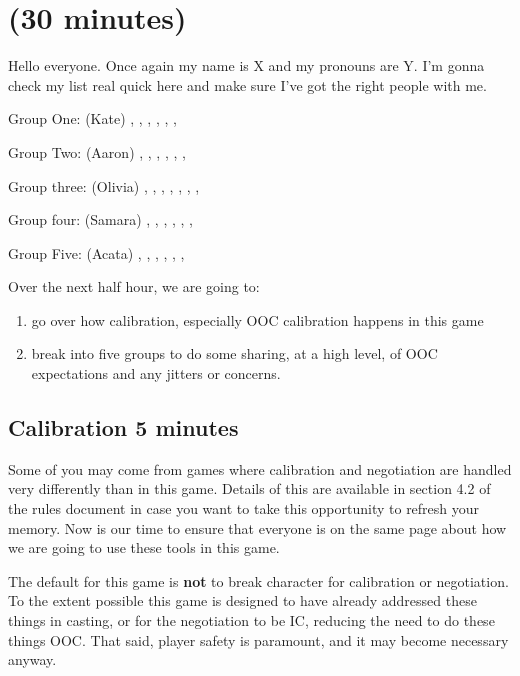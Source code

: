 \documentclass[green]{GL2020}
\begin{document}
\name{\gCalibrationWS{}}

\section*{(30 minutes)}


Hello everyone.  Once again my name is X and my pronouns are Y. I'm gonna check my list real quick here and make sure I've got the right people with me.

Group One: (Kate)
\cPrince{}, \cPirate{}, \cFlowPriest{}, \cCurse{}, \cChupLeader{}, \cAdopted{}, \cMusic{}

Group Two: (Aaron)
\cLibAssist{}, \cEvil{}, \cHistory{}, \cChupSecond{}, \cAntiChup{}, \cScholarship{}, \cChupInventor{}

Group three: (Olivia)
\cBeetle{}, \cEthics{}, \cJuniorStatesman{}, \cInterpol{}, \cLibrarian{}, \cChupAvenger{}, \cHeadScientist{}, \cAssistantScientist{}

Group four: (Samara)
\cDiplomat{}, \cHeir{}, \cAmbition{}, \cChupStudent{}, \cPresident{}, \cBunker{}, \cInitiate{}

Group Five: (Acata)
\cTechStar{}, \cPirateChild{}, \cDisney{}, \cWildCard{}, \cWarlordDaughter{}, \cHedonist{}, \cEbbPriest{}

Over the next half hour, we are going to:
\begin{enumerate}
	\item go over how calibration, especially OOC calibration happens in this game
	\item break into five groups to do some sharing, at a high level, of OOC expectations 
and any jitters or concerns. 
\end{enumerate}


\subsection*{Calibration {5 minutes}}

Some of you may come from games where calibration and negotiation are handled very differently than in this game. Details of this are available in section 4.2 of the rules document in case you want to take this opportunity to refresh your memory. Now is our time to ensure that everyone is on the same page about how we are going to use these tools in this game.

The default for this game is \textbf{not} to break character for calibration or negotiation. To the extent possible this game is designed to have already addressed these things in casting, or for the negotiation to be IC, reducing the need to do these things OOC. That said, player safety is paramount, and it may become necessary anyway.
\end{document}
